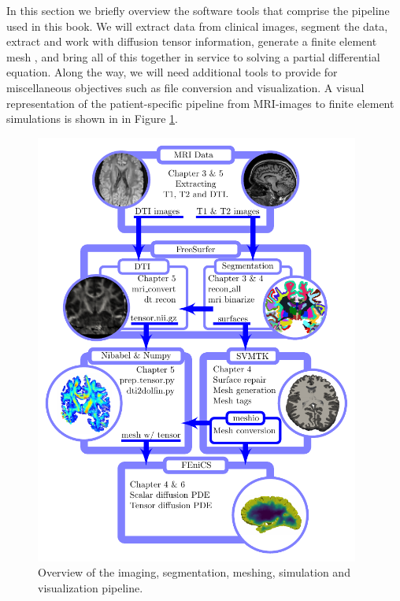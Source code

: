 In this section we briefly overview the software tools that comprise
the pipeline used in this book. We will extract data from clinical
images, segment the data, extract and work with diffusion tensor
information, generate a finite element mesh , and bring all of this
together in service to solving a partial differential equation. Along
the way, we will need additional tools to provide for miscellaneous
objectives such as file conversion and visualization. A visual
representation of the patient-specific pipeline from MRI-images to
finite element simulations is shown in in Figure
\ref{fig:chp2:imaging-pipeine-overview}.

\begin{figure}
\centering
 \includegraphics[width=0.95\textwidth]{./chapters/chp2/FIG/pipeline-overview.pdf} 
  \caption{Overview of the imaging, segmentation, meshing, simulation and visualization pipeline.}
  \label{fig:chp2:imaging-pipeine-overview}
\end{figure}


